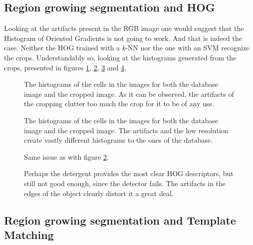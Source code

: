\documentclass[../main.tex]{subfiles}
\begin{document}
\subsection{Region growing segmentation and HOG}
Looking at the artifacts present in the RGB image one would suggest that the Histogram of Oriented Gradients is not going to work. And that is indeed the case. Neither the HOG trained with a \emph{k}-NN nor the one with an SVM recognize the crops. Understandably so, looking at the histograms generated from the crops, presented in figures \ref{fig:hog_milk_crop}, \ref{fig:hog_pepsi_crop}, \ref{fig:hog_cocacola_crop} and \ref{fig:hog_detergent_crop}.

\begin{figure}[htbp]
    \centering
    \caption{The histograms of the cells in the images for both the database image and the cropped image. As it can be observed, the artifacts of the cropping clutter too much the crop for it to be of any use.}
    \label{fig:hog_milk_crop}
\end{figure}

\begin{figure}[htbp]
    \centering
    \caption{The histograms of the cells in the images for both the database image and the cropped image. The artifacts and the low resolution create vastly different histograms to the ones of the database.}
    \label{fig:hog_pepsi_crop}
\end{figure}

\begin{figure}[htbp]
    \centering
    \caption{Same issue as with figure \ref{fig:hog_pepsi_crop}.}
    \label{fig:hog_cocacola_crop}
\end{figure}

\begin{figure}[htbp]
    \centering
    \caption{Perhaps the detergent provides the most clear HOG descriptors, but still not good enough, since the detector fails. The artifacts in the edges of the object clearly distort it a great deal.}
    \label{fig:hog_detergent_crop}
\end{figure}

\subsection{Region growing segmentation and Template Matching}
\end{document}
